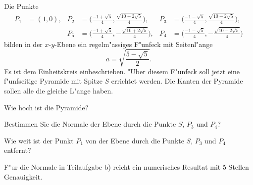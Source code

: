 Die Punkte
\begin{align*}
P_1&=(1,0),
&P_2&=\biggl(\frac{-1+\sqrt{5}}4, \frac{\sqrt{10+2\sqrt{5}}}4 \biggr),
&P_3&=\biggl(\frac{-1-\sqrt{5}}4, \frac{\sqrt{10-2\sqrt{5}}}4 \biggr),\\
&&P_5&=\biggl(\frac{-1+\sqrt{5}}4,-\frac{\sqrt{10+2\sqrt{5}}}4 \biggr),
&P_4&=\biggl(\frac{-1-\sqrt{5}}4,-\frac{\sqrt{10-2\sqrt{5}}}4 \biggr)
\end{align*}
bilden in der $x$-$y$-Ebene ein regelm"assiges F"unfeck mit Seitenl"ange
\[
a=\sqrt{\frac{5-\sqrt{5}}2}.
\]
Es ist dem Einheitskreis einbeschrieben.
"Uber diesem F"unfeck  soll jetzt eine f"unfseitige Pyramide mit
Spitze $S$ errichtet werden.
Die Kanten der Pyramide sollen alle die gleiche L"ange haben.
\begin{teilaufgaben}
\item
Wie hoch ist die Pyramide?
\item
Bestimmen Sie die Normale der Ebene durch die Punkte
$S$, $P_3$ und $P_4$?
\item
Wie weit ist der Punkt $P_1$ von der Ebene durch die Punkte
$S$, $P_3$ und $P_4$ entfernt?
\end{teilaufgaben}

\begin{hinweis}
F"ur die Normale in Teilaufgabe b) reicht ein numerisches Resultat
mit 5 Stellen Genauigkeit.
\end{hinweis}


